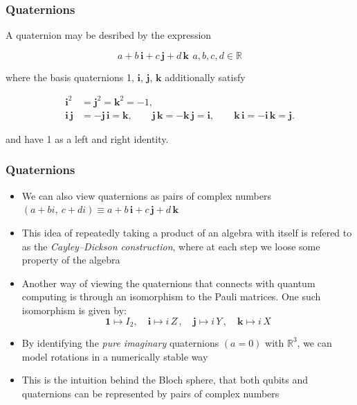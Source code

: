 \documentclass{beamer}
\begin{document}
\begin{frame}
\frametitle{Quaternions}

\begin{definition}[Quaternions]
A quaternion may be desribed by the expression

$$
a + b\,\mathbf{i} +  c\,\mathbf{j} + d\,\mathbf{k}\ \, a, b, c, d \in \mathbb{R}
$$

where the basis quaternions 1, $\mathbf{i}$, $\mathbf{j}$, $\mathbf{k}$ additionally satisfy

\begin{align*}
\mathbf i^2 &= \mathbf j^2 = \mathbf k^2 = -1, \\
\mathbf{i\,j} &= - \mathbf{j\,i} = \mathbf k, \qquad
\mathbf{j\,k} = - \mathbf{k\,j} = \mathbf i, \qquad
\mathbf{k\,i} = - \mathbf{i\,k} = \mathbf j.
\end{align*}

and have 1 as a left and right identity.

\end{definition}
\end{frame}

\begin{frame}
\frametitle{Quaternions}


\begin{itemize}
	\item We can also view quaternions as pairs of complex numbers $(a + bi,\ c + di) \equiv a + b\,\mathbf{i} +  c\,\mathbf{j} + d\,\mathbf{k}$
	\item This idea of repeatedly taking a product of an algebra with itself is refered to as the \textit{Cayley–Dickson construction}, where at each step we loose some property of the algebra
	\item Another way of viewing the quaternions that connects with quantum computing is through an isomorphism to the Pauli matrices. One such isomorphism is given by:
$$
  \mathbf{1} \mapsto I_2, \quad
  \mathbf{i} \mapsto i\,Z \, , \quad
  \mathbf{j} \mapsto i\,Y \, , \quad
  \mathbf{k} \mapsto i\,X
$$
	\item By identifying the \textit{pure imaginary} quaternions $(a = 0)$ with $\mathbb{R} ^ 3$, we can model rotations in a numerically stable way
	\item This is the intuition behind the Bloch sphere, that both qubits and quaternions can be represented by pairs of complex numbers
\end{itemize}

\end{frame}
\end{document}
